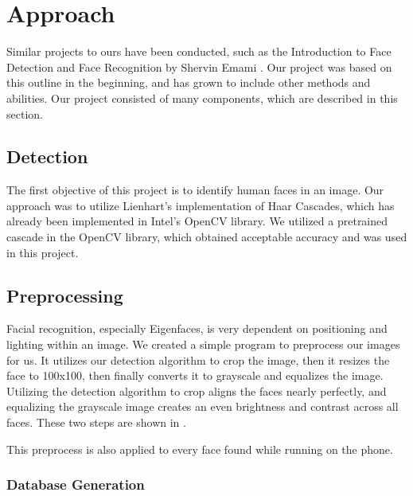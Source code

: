 \section{Approach} %

Similar projects to ours have been conducted, such as the Introduction
to Face Detection and Face Recognition by Shervin Emami \cite{Emami}.
Our project was based on this outline in the beginning, and has grown
to include other methods and abilities.  Our project consisted of many
components, which are described in this section.



\subsection{Detection}

The first objective of this project is to identify human faces in an
image.  Our approach was to utilize Lienhart's implementation
\cite{Lienhart} of Haar Cascades, which has already been implemented
in Intel's OpenCV library. \cite{opencv} We utilized a pretrained
cascade in the OpenCV library, which obtained acceptable accuracy and
was used in this project.

\subsection{Preprocessing}\label{preprocess}

Facial recognition, especially Eigenfaces, is very dependent on
positioning and lighting within an image.  We created a simple program
to preprocess our images for us.  It utilizes our detection algorithm
to crop the image, then it resizes the face to 100x100, then finally
converts it to grayscale and equalizes the image.  Utilizing the
detection algorithm to crop aligns the faces nearly perfectly, and
equalizing the grayscale image creates an even brightness and contrast
across all faces. These two steps are shown in
.


This preprocess is also applied to every face found while running on
the phone.

\subsubsection{Database Generation}

